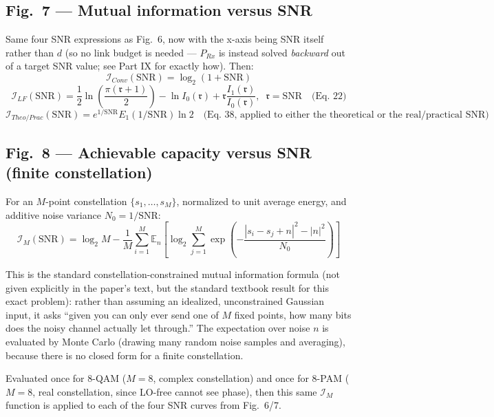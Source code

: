 \documentclass[11pt]{article}
\begin{document}
\subsection*{Fig.~7 --- Mutual information versus SNR}
Same four SNR expressions as Fig.~6, now with the x-axis being SNR itself rather than $d$ (so no link budget is needed --- $P_{Rx}$ is instead solved \emph{backward} out of a target SNR value; see Part IX for exactly how). Then:
\[
\boxed{\mathcal I_{Conv}(\text{SNR}) = \log_2(1+\text{SNR})}
\]
\[
\boxed{\mathcal I_{LF}(\text{SNR}) = \frac12\ln\!\left(\frac{\pi(\mathfrak r+1)}{2}\right)-\ln I_0(\mathfrak r)+\mathfrak r\frac{I_1(\mathfrak r)}{I_0(\mathfrak r)},\;\; \mathfrak r=\text{SNR}\quad\text{(Eq.~22)}}
\]
\[
\boxed{\mathcal I_{Theo/Prac}(\text{SNR}) = e^{1/\text{SNR}}E_1(1/\text{SNR})\ln 2 \quad\text{(Eq.~38, applied to either the theoretical or the real/practical SNR)}}
\]

\subsection*{Fig.~8 --- Achievable capacity versus SNR (finite constellation)}
For an $M$-point constellation $\{s_1,\dots,s_M\}$, normalized to unit average energy, and additive noise variance $N_0=1/\text{SNR}$:
\[
\boxed{\mathcal I_M(\text{SNR}) = \log_2 M - \frac1M\sum_{i=1}^M \mathbb E_n\left[\log_2\sum_{j=1}^M \exp\!\left(-\frac{|s_i-s_j+n|^2-|n|^2}{N_0}\right)\right]}
\]
\begin{eqmeaning}
This is the standard constellation-constrained mutual information formula (not given explicitly in the paper's text, but the standard textbook result for this exact problem): rather than assuming an idealized, unconstrained Gaussian input, it asks ``given you can only ever send one of $M$ fixed points, how many bits does the noisy channel actually let through.'' The expectation over noise $n$ is evaluated by Monte Carlo (drawing many random noise samples and averaging), because there is no closed form for a finite constellation.
\end{eqmeaning}
Evaluated once for 8-QAM ($M=8$, complex constellation) and once for 8-PAM ($M=8$, real constellation, since LO-free cannot see phase), then this same $\mathcal I_M$ function is applied to each of the four SNR curves from Fig.~6/7.
\end{document}
